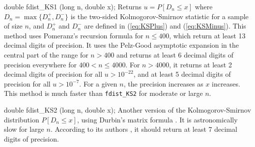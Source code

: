 double fdist_KS1 (long n, double x);
\endcode
 \tab Returns $u = P[D_n \le x]$ %
   where $D_n = \max\{D_n^+, D_n^-\}$
  is the two-sided Kolmogorov-Smirnov statistic \cite{tBRO07a} for a sample
  of size $n$, and $D_n^+$ and $D_n^-$ are defined in (\ref{eq:KSPlus}) and
  (\ref{eq:KSMinus}).
 This method uses Pomeranz's recursion formula \cite{tBRO08a,tPOM74a} for
$n \le 400$, which return at least 13 decimal digits of precision. It uses
the Pelz-Good asymptotic expansion \cite{tPEL76a} in the central part of
 the range for $n > 400$ and returns at least 6 decimal digits of precision
 everywhere for $400 < n \le 4000$. For $n > 4000$, it returns at least
 2 decimal digits of precision for all $u > 10^{-22}$, and at least
 5 decimal digits of precision for all $u > 10^{-7}$.
For a given $n$, the precision increases as $x$ increases.
 This method is much faster than  {\tt fdist\_KS2} for moderate or large $n$.
 \endtab
\code


double fdist_KS2 (long n, double x);
\endcode
\tab Another version of the Kolmogorov-Smirnov distribution
$ P[D_n \le x]$, using Durbin's matrix formula \cite{tDUR73a}.
It is astronomically slow for large $n$. According to its authors
\cite{tMAR03a}, it should return at least 7 decimal digits
of precision.
\endtab
\code


